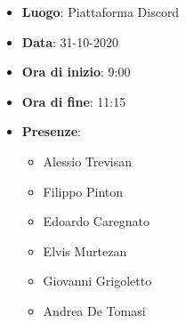 \begin{itemize}
    \item \textbf{Luogo}: Piattaforma Discord
    \item \textbf{Data}: 31-10-2020
    \item \textbf{Ora di inizio}: 9:00
    \item \textbf{Ora di fine}: 11:15
    \item \textbf{Presenze}:
          \begin{itemize}
              \item Alessio Trevisan
              \item Filippo Pinton
              \item Edoardo Caregnato
              \item Elvis Murtezan
              \item Giovanni Grigoletto
              \item Andrea De Tomasi
          \end{itemize}
\end{itemize}